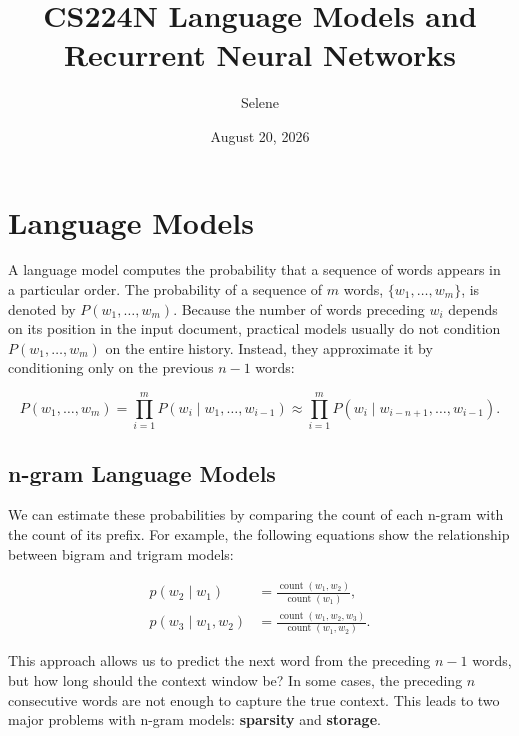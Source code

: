\documentclass[
  a4paper,
  10pt]{article}
\title{CS224N \textbar{} Language Models and Recurrent Neural Networks}
\author{Selene}
\date{August 20, 2026}
\begin{document}
\maketitle

\section{Language Models}\label{language-models}

A language model computes the probability that a sequence of words
appears in a particular order. The probability of a sequence of \(m\)
words, \(\{w_1,\ldots,w_m\}\), is denoted by \(P(w_1,\ldots,w_m)\).
Because the number of words preceding \(w_i\) depends on its position in
the input document, practical models usually do not condition
\(P(w_1,\ldots,w_m)\) on the entire history. Instead, they approximate
it by conditioning only on the previous \(n-1\) words:

\[
P(w_1,\ldots,w_m)
=\prod_{i=1}^{m}P(w_i\mid w_1,\ldots,w_{i-1})
\approx\prod_{i=1}^{m}P(w_i\mid w_{i-n+1},\ldots,w_{i-1}).
\]

\subsection{n-gram Language Models}\label{n-gram-language-models}

We can estimate these probabilities by comparing the count of each
n-gram with the count of its prefix. For example, the following
equations show the relationship between bigram and trigram models:

\[
\begin{aligned}
p(w_2\mid w_1)
&=\frac{\operatorname{count}(w_1,w_2)}{\operatorname{count}(w_1)},\\
p(w_3\mid w_1,w_2)
&=\frac{\operatorname{count}(w_1,w_2,w_3)}{\operatorname{count}(w_1,w_2)}.
\end{aligned}
\]

This approach allows us to predict the next word from the preceding
\(n-1\) words, but how long should the context window be? In some cases,
the preceding \(n\) consecutive words are not enough to capture the true
context. This leads to two major problems with n-gram models:
\textbf{sparsity} and \textbf{storage}.
\end{document}
